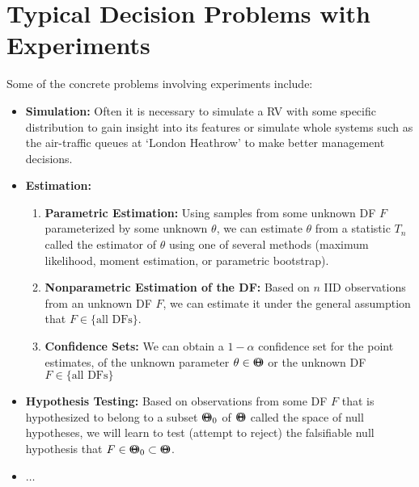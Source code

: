 \section{Typical Decision Problems with Experiments}
Some of the concrete problems involving experiments include:
\begin{itemize}
\item {\bf Simulation:} Often it is necessary to simulate a RV with some specific distribution to gain insight into its features or simulate whole systems such as the air-traffic queues at `London Heathrow' to make better management decisions.
\item {\bf Estimation:} 
\begin{enumerate}
\item {\bf Parametric Estimation:} Using samples from some unknown DF $F$ parameterized by some unknown $\theta$, we can estimate $\theta$ from a statistic $T_n$ called the estimator of $\theta$ using one of several methods (maximum likelihood, moment estimation, or parametric bootstrap).
\item {\bf Nonparametric Estimation of the DF:}  Based on $n$ IID observations from an unknown DF $F$, we can estimate it under the general assumption that $F \in \{ \text{all DFs} \}$.
\item {\bf Confidence Sets:}  We can obtain a $1-\alpha$ confidence set for the point estimates, of the unknown parameter $\theta \in {\Theta}\mspace{-11 mu}{\Theta}$ or the unknown  DF $F \in \{ \text{all DFs} \}$
\end{enumerate}
\item {\bf Hypothesis Testing:}  Based on observations from some DF $F$ that is hypothesized to belong to a subset ${\Theta}\mspace{-11 mu}{\Theta}_0$ of ${\Theta}\mspace{-11 mu}{\Theta}$ called the space of null hypotheses, we will learn to test (attempt to reject) the falsifiable null hypothesis that $F \in {\Theta}\mspace{-11 mu}{\Theta}_0 \subset {\Theta}\mspace{-11 mu}{\Theta}$.
\item $\ldots $ 
\end{itemize}



